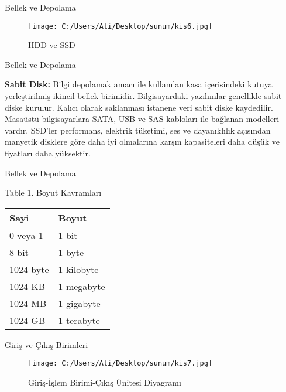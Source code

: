 \documentclass[
  12pt,
  ignorenonframetext,
]{beamer}
\begin{document}
\begin{frame}{Bellek ve Depolama}
\protect\hypertarget{bellek-ve-depolama-4}{}

\begin{figure}
\centering
\texttt{[image: C:/Users/Ali/Desktop/sunum/kis6.jpg]}
\caption{HDD ve SSD}
\end{figure}

\end{frame}

\begin{frame}{Bellek ve Depolama}
\protect\hypertarget{bellek-ve-depolama-5}{}

\justify

\textbf{Sabit Disk:} Bilgi depolamak amacı ile kullanılan kasa
içerisindeki kutuya yerleştirilmiş ikincil bellek birimidir.
Bilgisayardaki yazılımlar genellikle sabit diske kurulur. Kalıcı olarak
saklanması istanene veri sabit diske kaydedilir. Masaüstü bilgisayarlara
SATA, USB ve SAS kabloları ile bağlanan modelleri vardır. SSD'ler
performans, elektrik tüketimi, ses ve dayanıklılık açısından manyetik
disklere göre daha iyi olmalarına karşın kapasiteleri daha düşük ve
fiyatları daha yüksektir.

\end{frame}

\begin{frame}{Bellek ve Depolama}
\protect\hypertarget{bellek-ve-depolama-6}{}

Table 1. Boyut Kavramları

\begin{table}[H]
\centering
\begin{tabular}{l|l}
\hline
\textbf{Sayi} & \textbf{Boyut}\\
\hline
0 veya 1 & 1 bit\\
\hline
8 bit & 1 byte\\
\hline
1024 byte & 1 kilobyte\\
\hline
1024 KB & 1 megabyte\\
\hline
1024 MB & 1 gigabyte\\
\hline
1024 GB & 1 terabyte\\
\hline
\end{tabular}
\end{table}

\end{frame}

\begin{frame}{Giriş ve Çıkış Birimleri}
\protect\hypertarget{giriux15f-ve-uxe7ux131kux131ux15f-birimleri}{}

\begin{figure}
\centering
\texttt{[image: C:/Users/Ali/Desktop/sunum/kis7.jpg]}
\caption{Giriş-İşlem Birimi-Çıkış Ünitesi Diyagramı}
\end{figure}

\end{frame}
\end{document}
